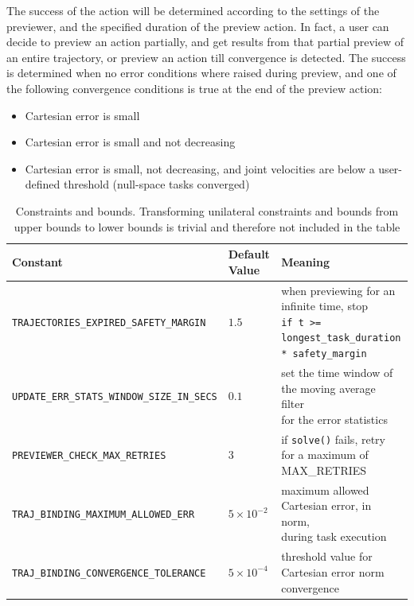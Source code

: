The success of the action will be determined according to the settings of the previewer, and the specified duration of the preview action. In fact, a user can decide to preview an action partially, and get results from that partial preview of an entire trajectory, or preview an action till convergence is detected. The success is determined when no error conditions where raised during preview, and one of the following convergence conditions is true at the end of the preview action:
\begin{itemize}
\item Cartesian error is small
\item Cartesian error is small and not decreasing
\item Cartesian error is small, not decreasing, and joint velocities are below a user-defined threshold (null-space tasks converged) 
\end{itemize}

\begin{table}[hbt]
   \small
   \begin{center}
   \begin{tabular}{| >{\centering\arraybackslash}m{2.3in} | >{\centering\arraybackslash}m{0.5in} | >{\centering\arraybackslash}m{3in} |}
   \hline
   \textbf{Constant} & \textbf{Default Value} & \textbf{Meaning} \\\hline
   \cline{1-3}
   \texttt{TRAJECTORIES\_EXPIRED\_SAFETY\_MARGIN}           & $1.5$   & \shortstack{when previewing for an infinite time, stop \\ \texttt{if t >= longest\_task\_duration * safety\_margin}} \\\hline
   \texttt{UPDATE\_ERR\_STATS\_WINDOW\_SIZE\_IN\_SECS} & $0.1$    & \shortstack{set the time window of the moving average filter \\ for the error statistics} \\\hline
   \texttt{PREVIEWER\_CHECK\_MAX\_RETRIES}                  & $3$     & if \texttt{solve()} fails, retry for a maximum of MAX\_RETRIES \\\hline
   \texttt{TRAJ\_BINDING\_MAXIMUM\_ALLOWED\_ERR}           & $5\times10^{-2}$  & \shortstack{maximum allowed Cartesian error, in norm, \\ during task execution} \\\hline
   \texttt{TRAJ\_BINDING\_CONVERGENCE\_TOLERANCE}           & $5\times10^{-4}$  & threshold value for Cartesian error norm convergence \\\hline
   \end{tabular}
   \end{center}
   \caption{Constraints and bounds. Transforming unilateral constraints and bounds from upper bounds to lower bounds is trivial and therefore not included in the table}
   \label{table:previewer_constants}
\end{table}

